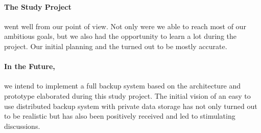 \paragraph{The Study Project}
went well from our point of view. Not only were we able to reach most of our ambitious goals, but we also had the opportunity to learn a lot during the project. Our initial planning and the  turned out to be mostly accurate.

\paragraph{In the Future,}
we intend to implement a full backup system based on the architecture and prototype elaborated during this study project. The initial vision of an easy to use distributed backup system with private data storage has not only turned out to be realistic but has also been positively received and led to stimulating discussions.
